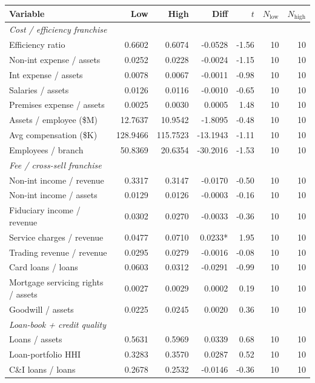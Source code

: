 \begin{tabular}{lrrrrrr}
\toprule
Variable & Low & High & Diff & $t$ & $N_{\text{low}}$ & $N_{\text{high}}$ \\
\midrule
\multicolumn{7}{l}{\emph{Cost / efficiency franchise}} \\
\midrule
Efficiency ratio & 0.6602 & 0.6074 & -0.0528 & -1.56 & 10 & 10 \\
Non-int expense / assets & 0.0252 & 0.0228 & -0.0024 & -1.15 & 10 & 10 \\
Int expense / assets & 0.0078 & 0.0067 & -0.0011 & -0.98 & 10 & 10 \\
Salaries / assets & 0.0126 & 0.0116 & -0.0010 & -0.65 & 10 & 10 \\
Premises expense / assets & 0.0025 & 0.0030 & 0.0005 & 1.48 & 10 & 10 \\
Assets / employee (\$M) & 12.7637 & 10.9542 & -1.8095 & -0.48 & 10 & 10 \\
Avg compensation (\$K) & 128.9466 & 115.7523 & -13.1943 & -1.11 & 10 & 10 \\
Employees / branch & 50.8369 & 20.6354 & -30.2016 & -1.53 & 10 & 10 \\
\midrule
\multicolumn{7}{l}{\emph{Fee / cross-sell franchise}} \\
\midrule
Non-int income / revenue & 0.3317 & 0.3147 & -0.0170 & -0.50 & 10 & 10 \\
Non-int income / assets & 0.0129 & 0.0126 & -0.0003 & -0.16 & 10 & 10 \\
Fiduciary income / revenue & 0.0302 & 0.0270 & -0.0033 & -0.36 & 10 & 10 \\
Service charges / revenue & 0.0477 & 0.0710 & 0.0233* & 1.95 & 10 & 10 \\
Trading revenue / revenue & 0.0295 & 0.0279 & -0.0016 & -0.08 & 10 & 10 \\
Card loans / loans & 0.0603 & 0.0312 & -0.0291 & -0.99 & 10 & 10 \\
Mortgage servicing rights / assets & 0.0027 & 0.0029 & 0.0002 & 0.19 & 10 & 10 \\
Goodwill / assets & 0.0225 & 0.0245 & 0.0020 & 0.36 & 10 & 10 \\
\midrule
\multicolumn{7}{l}{\emph{Loan-book + credit quality}} \\
\midrule
Loans / assets & 0.5631 & 0.5969 & 0.0339 & 0.68 & 10 & 10 \\
Loan-portfolio HHI & 0.3283 & 0.3570 & 0.0287 & 0.52 & 10 & 10 \\
C\&I loans / loans & 0.2678 & 0.2532 & -0.0146 & -0.36 & 10 & 10 \\

\end{tabular}
